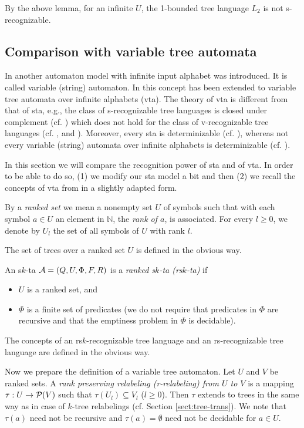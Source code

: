 \documentclass[10pt]{scrartcl}
\begin{document}
By the above lemma, for an infinite $U$, the 1-bounded tree language $L_2$ is not s-recognizable.





\subsection{Comparison with variable tree automata}

In \cite{grukupshe10} another automaton model with infinite input alphabet was introduced. It is called
variable (string) automaton. In  \cite{menrah11} this concept has been extended to 
variable tree automata over infinite alphabets (vta). The theory of
vta is different from that of sta, e.g., the class of s-recognizable
tree languages is closed under complement (cf. 
\cite[Prop. 3]{veabjo11a}) which does not hold for the class of v-recognizable
tree languages (cf. \cite[Cor. 2]{menrah11}, and  
\cite[Thm. 2]{grukupshe10}). Moreover, every sta is determinizable (cf.  
\cite[Thm. 1]{veabjo11a}), whereas not every variable (string) automata over infinite
alphabets is determinizable (cf. \cite[Sec. 4.1]{grukupshe10}). 

In this section we will compare the recognition power of sta and of vta. In order to be able to do so,  (1) we modify our sta model a bit and then (2) we recall the concepts of vta from \cite{menrah11} in a slightly
adapted form.

By a {\em ranked set} we mean a nonempty set $U$ of symbols such that with each symbol $a \in U$ an element in $\mathbb{N}$, the {\em rank of $a$},  is
  associated. For every $l
\ge 0$, we  denote by $U_{l}$ the set of all symbols of $U$ with rank $l$. 

The set of trees over a ranked set $U$ is defined in the obvious way.

An s$k$-ta ${\cal A} = (Q,U,\Phi,F,R)$ is a {\em ranked s$k$-ta (rs$k$-ta)} if
\begin{itemize}
\item $U$ is a  ranked set, and
\item $\Phi$ is a finite set of predicates (we do not require that predicates in $\Phi$ are recursive and that the emptiness problem in $\Phi$ is decidable).
   \end{itemize} 
The concepts of an rs$k$-recognizable tree language and an rs-recognizable tree language are defined in the obvious way.

Now we prepare the definition of a variable tree automaton. Let $U$ and $V$ be ranked sets.  A {\em rank preserving relabeling (r-relabeling) from $U$ to $V$} is a mapping $\tau: U \rightarrow {\cal P}(V)$ such that $\tau(U_l) \subseteq V_l$ ($l\geq 0$). Then $\tau$ extends to trees in the same way as  in case of $k$-tree relabelings (cf. Section \ref{sect:tree-trans}).
We note that $\tau(a)$ need not be recursive and $\tau(a)=\emptyset$ need not be decidable for
$a \in U$. 
\end{document}
